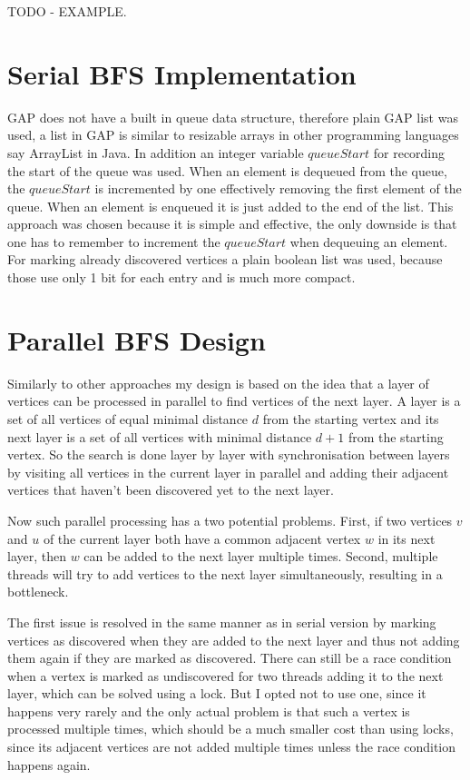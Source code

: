\documentclass{report}
\theoremstyle{plain}
\theoremstyle{definition}
\theoremstyle{remark}
\begin{document}
TODO - EXAMPLE.

\section{Serial BFS Implementation}

GAP does not have a built in queue data structure, therefore plain GAP list was used, a list in GAP is similar to resizable arrays in other programming languages say ArrayList in Java. In addition an integer variable $queueStart$ for recording the start of the queue was used. When an element is dequeued from the queue, the $queueStart$ is incremented by one effectively removing the first element of the queue. When an element is enqueued it is just added to the end of the list. This approach was chosen because it is simple and effective, the only downside is that one has to remember to increment the $queueStart$ when dequeuing an element. For marking already discovered vertices a plain boolean list was used, because those use only 1 bit for each entry and is much more compact.

\section{Parallel BFS Design}

Similarly to other approaches my design is based on the idea that a layer of vertices can be processed in parallel to find vertices of the next layer. A layer is a set of all vertices of equal minimal distance $d$ from the starting vertex and its next layer is a set of all vertices with minimal distance $d + 1$ from the starting vertex. So the search is done layer by layer with synchronisation between layers by visiting all vertices in the current layer in parallel and adding their adjacent vertices that haven't been discovered yet to the next layer.

Now such parallel processing has a two potential problems. First, if two vertices $v$ and $u$ of the current layer both have a common adjacent vertex $w$ in its next layer, then $w$ can be added to the next layer multiple times. Second, multiple threads will try to add vertices to the next layer simultaneously, resulting in a bottleneck.

The first issue is resolved in  the same manner as in serial version by marking vertices as discovered when they are added to the next layer and thus not adding them again if they are marked as discovered. There can still be a race condition when a vertex is marked as undiscovered for two threads adding it to the next layer, which can be solved using a lock. But I opted not to use one, since it happens very rarely and the only actual problem is that such a vertex is processed multiple times, which should be a much smaller cost than using locks, since its adjacent vertices are not added multiple times unless the race condition happens again.
\end{document}

